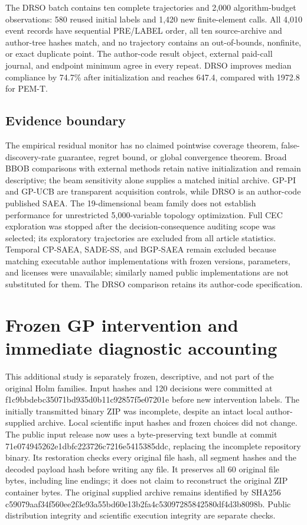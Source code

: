 \documentclass[suppldata]{interact}
\begin{document}
The DRSO batch contains ten complete trajectories and 2,000 algorithm-budget observations: 580 reused initial labels and 1,420 new finite-element calls. All 4,010 event records have sequential PRE/LABEL order, all ten source-archive and author-tree hashes match, and no trajectory contains an out-of-bounds, nonfinite, or exact duplicate point. The author-code result object, external paid-call journal, and endpoint minimum agree in every repeat. DRSO improves median compliance by 74.7\% after initialization and reaches 647.4, compared with 1972.8 for PEM-T.

\hypertarget{evidence-boundary}{%
\subsection{Evidence boundary}\label{evidence-boundary}}

The empirical residual monitor has no claimed pointwise coverage theorem, false-discovery-rate guarantee, regret bound, or global convergence theorem. Broad BBOB comparisons with external methods retain native initialization and remain descriptive; the beam sensitivity alone supplies a matched initial archive. GP-PI and GP-UCB are transparent acquisition controls, while DRSO is an author-code published SAEA. The 19-dimensional beam family does not establish performance for unrestricted 5,000-variable topology optimization. Full CEC exploration was stopped after the decision-consequence auditing scope was selected; its exploratory trajectories are excluded from all article statistics. Temporal CP-SAEA, SADE-SS, and BGP-SAEA remain excluded because matching executable author implementations with frozen versions, parameters, and licenses were unavailable; similarly named public implementations are not substituted for them. The DRSO comparison retains its author-code specification.

\hypertarget{frozen-gp-intervention-and-immediate-diagnostic-accounting}{%
\section{Frozen GP intervention and immediate diagnostic accounting}\label{frozen-gp-intervention-and-immediate-diagnostic-accounting}}

This additional study is separately frozen, descriptive, and not part of the original Holm families. Input hashes and 120 decisions were committed at f1c9bbdebc35071bd935d0b11c92857f5e07201e before new intervention labels. The initially transmitted binary ZIP was incomplete, despite an intact local author-supplied archive. Local scientific input hashes and frozen choices did not change. The public input release now uses a byte-preserving text bundle at commit 71e074945262e1dbfc223726c7216e5415385ddc, replacing the incomplete repository binary. Its restoration checks every original file hash, all segment hashes and the decoded payload hash before writing any file. It preserves all 60 original file bytes, including line endings; it does not claim to reconstruct the original ZIP container bytes. The original supplied archive remains identified by SHA256 c59079aaf34f560ee2f3e93a55bd60e13b2fa4c53097285842580df4d3b8098b. Public distribution integrity and scientific execution integrity are separate checks.
\end{document}

